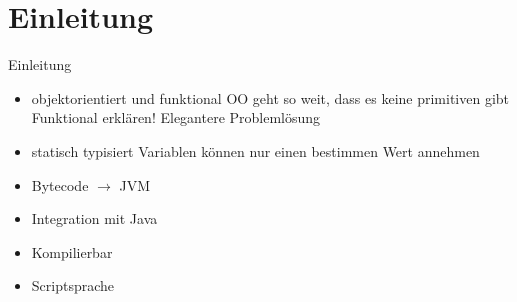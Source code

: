 \section{Einleitung}

\begin{frame}[t]{Einleitung}

\begin{itemize}[<+->]
\item objektorientiert und funktional
 {OO geht so weit, dass es keine primitiven gibt}
 {Funktional erklären!}
 {Elegantere Problemlösung}
\item statisch typisiert
 {Variablen können nur einen bestimmen Wert annehmen}
\item Bytecode $\rightarrow$ JVM
\item Integration mit Java
\item Kompilierbar
\item Scriptsprache
\end{itemize}


\end{frame}
